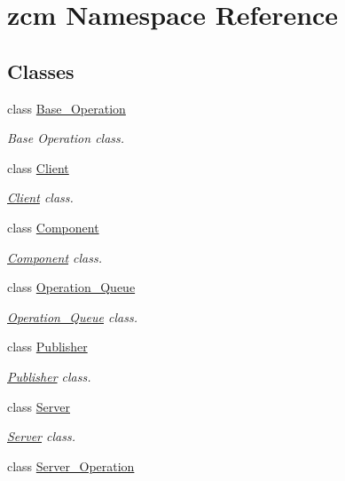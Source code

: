 \hypertarget{namespacezcm}{}\section{zcm Namespace Reference}
\label{namespacezcm}
\subsection*{Classes}
\begin{DoxyCompactItemize}
\item 
class \hyperlink{classzcm_1_1Base__Operation}{Base\+\_\+\+Operation}
\begin{DoxyCompactList}\small\item\em Base Operation class. \end{DoxyCompactList}\item 
class \hyperlink{classzcm_1_1Client}{Client}
\begin{DoxyCompactList}\small\item\em \hyperlink{classzcm_1_1Client}{Client} class. \end{DoxyCompactList}\item 
class \hyperlink{classzcm_1_1Component}{Component}
\begin{DoxyCompactList}\small\item\em \hyperlink{classzcm_1_1Component}{Component} class. \end{DoxyCompactList}\item 
class \hyperlink{classzcm_1_1Operation__Queue}{Operation\+\_\+\+Queue}
\begin{DoxyCompactList}\small\item\em \hyperlink{classzcm_1_1Operation__Queue}{Operation\+\_\+\+Queue} class. \end{DoxyCompactList}\item 
class \hyperlink{classzcm_1_1Publisher}{Publisher}
\begin{DoxyCompactList}\small\item\em \hyperlink{classzcm_1_1Publisher}{Publisher} class. \end{DoxyCompactList}\item 
class \hyperlink{classzcm_1_1Server}{Server}
\begin{DoxyCompactList}\small\item\em \hyperlink{classzcm_1_1Server}{Server} class. \end{DoxyCompactList}\item 
class \hyperlink{classzcm_1_1Server__Operation}{Server\+\_\+\+Operation}

\end{DoxyCompactItemize}
